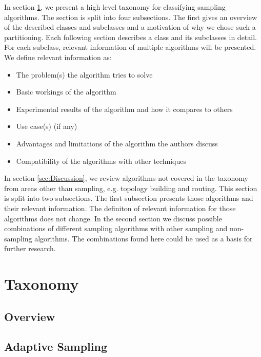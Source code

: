   In section \ref{sec:Taxonomy}, we present a high level taxonomy for classifying sampling algorithms. The section is split into four subsections. The first gives an overview of the described classes and subclasses and a motivation of why we chose such a partitioning. Each following section describes a class and its subclasses in detail. For each subclass, relevant information of multiple algorithms will be presented. We define relevant information as:
\begin{itemize}
	\item The problem(s) the algorithm tries to solve
	\item Basic workings of the algorithm
	\item Experimental results of the algorithm and how it compares to others
	\item Use case(s) (if any)
	\item Advantages and limitations of the algorithm the authors discuss
	\item Compatibility of the algorithms with other techniques
\end{itemize}   


 In section \ref{sec:Discussion}, we review algorithms not covered in the taxonomy from areas other than sampling, e.g. topology building and routing. This section is split into two subsections. The first subsection presents those algorithms and their relevant information. The definiton of relevant information for those algorithms does not change. In the second section we discuss possible combinations of different sampling algorithms with other sampling and non-sampling algorithms. The combinations found here could be used as a basis for further research.


\section{Taxonomy}
\label{sec:Taxonomy}



\subsection{Overview}
\label{sec:Overview}


\subsection{Adaptive Sampling}
\label{sec:Adaptive Sampling}



